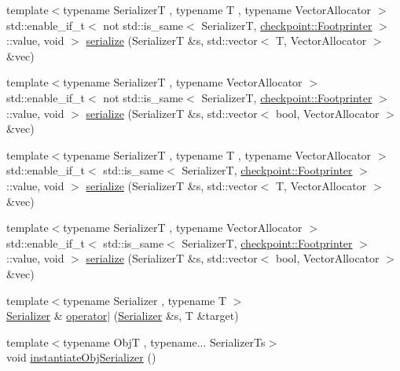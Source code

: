 \begin{DoxyCompactItemize}
\item 
{\footnotesize template$<$typename SerializerT , typename T , typename Vector\+Allocator $>$ }\\std\+::enable\+\_\+if\+\_\+t$<$ not std\+::is\+\_\+same$<$ SerializerT, \hyperlink{structcheckpoint_1_1_footprinter}{checkpoint\+::\+Footprinter} $>$\+::value, void $>$ \hyperlink{namespacecheckpoint_ae9a809c203a65d06dbd99acc82be4844}{serialize} (SerializerT \&s, std\+::vector$<$ T, Vector\+Allocator $>$ \&vec)
\item 
{\footnotesize template$<$typename SerializerT , typename Vector\+Allocator $>$ }\\std\+::enable\+\_\+if\+\_\+t$<$ not std\+::is\+\_\+same$<$ SerializerT, \hyperlink{structcheckpoint_1_1_footprinter}{checkpoint\+::\+Footprinter} $>$\+::value, void $>$ \hyperlink{namespacecheckpoint_a4dbdef848c92782b54888f6247f8e8ba}{serialize} (SerializerT \&s, std\+::vector$<$ bool, Vector\+Allocator $>$ \&vec)
\item 
{\footnotesize template$<$typename SerializerT , typename T , typename Vector\+Allocator $>$ }\\std\+::enable\+\_\+if\+\_\+t$<$ std\+::is\+\_\+same$<$ SerializerT, \hyperlink{structcheckpoint_1_1_footprinter}{checkpoint\+::\+Footprinter} $>$\+::value, void $>$ \hyperlink{namespacecheckpoint_a3f43839a02cd77538b0d2f4192e926be}{serialize} (SerializerT \&s, std\+::vector$<$ T, Vector\+Allocator $>$ \&vec)
\item 
{\footnotesize template$<$typename SerializerT , typename Vector\+Allocator $>$ }\\std\+::enable\+\_\+if\+\_\+t$<$ std\+::is\+\_\+same$<$ SerializerT, \hyperlink{structcheckpoint_1_1_footprinter}{checkpoint\+::\+Footprinter} $>$\+::value, void $>$ \hyperlink{namespacecheckpoint_af95ab4d3ad37bb33b284e3a51047d685}{serialize} (SerializerT \&s, std\+::vector$<$ bool, Vector\+Allocator $>$ \&vec)
\item 
{\footnotesize template$<$typename Serializer , typename T $>$ }\\\hyperlink{structcheckpoint_1_1_serializer}{Serializer} \& \hyperlink{namespacecheckpoint_a5c9a1c4d05ec6880270c9a6d0dded825}{operator$\vert$} (\hyperlink{structcheckpoint_1_1_serializer}{Serializer} \&s, T \&target)
\item 
{\footnotesize template$<$typename ObjT , typename... Serializer\+Ts$>$ }\\void \hyperlink{namespacecheckpoint_a09875c2d3c012be868f3fd88b3ed55be}{instantiate\+Obj\+Serializer} ()
\item 

\end{DoxyCompactItemize}

